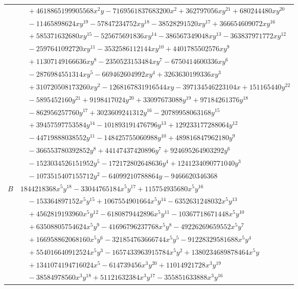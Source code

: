\documentclass[11pt]{article}
\begin{document}
\begin{longtable}{@{}ll@{}}
 & $\quad +4618865199905568x^{2}y-7169561837683200x^{2}+362797056xy^{21}+680244480xy^{20}$\\
 & $\quad -11465898624xy^{19}-57847234752xy^{18}-38528291520xy^{17}+366654609072xy^{16}$\\
 & $\quad +585371632680xy^{15}-525675691836xy^{14}-386567349048xy^{13}-363837971772xy^{12}$\\
 & $\quad -2597641092720xy^{11}-3532586112144xy^{10}+4401785502576xy^{9}$\\
 & $\quad +11307149166636xy^{8}-2350523153484xy^{7}-6750414600336xy^{6}$\\
 & $\quad -2876984551314xy^{5}-669462604992xy^{4}+3263630199336xy^{3}$\\
 & $\quad +310720508173260xy^{2}-1268167831916544xy-397134546223104x+151165440y^{22}$\\
 & $\quad -5895452160y^{21}+9198417024y^{20}+33097673088y^{19}+97184261376y^{18}$\\
 & $\quad -862956257760y^{17}+3023609241312y^{16}-20789958063168y^{15}$\\
 & $\quad +39457597753584y^{14}-101893191476796y^{13}+129233177288064y^{12}$\\
 & $\quad -44719888038552y^{11}-148425755060988y^{10}+489816847962180y^{9}$\\
 & $\quad -366553780392852y^{8}+44147437420896y^{7}+924695264903292y^{6}$\\
 & $\quad -1523034526151952y^{5}-172172802648636y^{4}+1241234090771040y^{3}$\\
 & $\quad -1073515407155712y^{2}-64099210788864y-9466620346368$\\
$B$ & $1844218368x^{5}y^{18}-33044765184x^{5}y^{17}+115754935680x^{5}y^{16}$\\
 & $\quad -153364897152x^{5}y^{15}+1067554901664x^{5}y^{14}-6352631248032x^{5}y^{13}$\\
 & $\quad +4562819193960x^{5}y^{12}-6180879442896x^{5}y^{11}-10367718671448x^{5}y^{10}$\\
 & $\quad +63508805754624x^{5}y^{9}-41696796237768x^{5}y^{8}-49226269659552x^{5}y^{7}$\\
 & $\quad +166958862068160x^{5}y^{6}-321854763666744x^{5}y^{5}-91228329581688x^{5}y^{4}$\\
 & $\quad +554016640912524x^{5}y^{3}-1657433963915784x^{5}y^{2}+1380234689878464x^{5}y$\\
 & $\quad +1341074194716024x^{5}-614739456x^{3}y^{20}+11014921728x^{3}y^{19}$\\
 & $\quad -38584978560x^{3}y^{18}+51121632384x^{3}y^{17}-355851633888x^{3}y^{16}$\\

\end{longtable}
\end{document}

